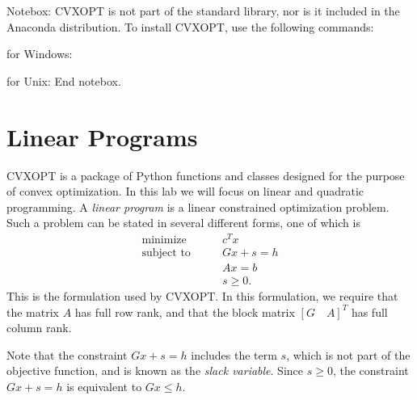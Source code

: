 \label{lab:Optimization 2}

Notebox: CVXOPT is not part of the standard library, nor is it included in the Anaconda distribution. To install CVXOPT, use the following commands:

for Windows: 

for Unix: 
End notebox.

\section*{Linear Programs}

CVXOPT is a package of Python functions and classes designed for the purpose of convex optimization.
In this lab we will focus on linear and quadratic programming.
A \emph{linear program} is a linear constrained optimization problem. Such a problem can be stated in several
different forms, one of which is
\begin{align*}
\text{minimize}\qquad &c^Tx \\
\text{subject to}\qquad &Gx + s = h\\
&Ax = b \\
 &s \geq 0.
\end{align*}
This is the formulation used by CVXOPT.
In this formulation, we require that the matrix $A$ has full row rank,
and that the block matrix $[G \quad A]^T$ has full column rank.

Note that the constraint $Gx +s = h$ includes the term $s$, which is not part of the objective
function, and is known as the \emph{slack variable}. Since $s  \geq 0$, the constraint
$Gx + s = h$ is equivalent to $Gx \leq h$.

\begin{comment}
The corresponding \emph{dual program} for the above linear program has the form
\begin{align*}
\text{maximize}\qquad &-h^Tz - b^Ty \\
\text{subject to}\qquad &G^Tz + A^Ty + c = 0\\
 &z \geq 0.
\end{align*}
CVXOPT provides functions to solve both the original (\emph{primal}) linear program and its dual program.
\end{comment}

